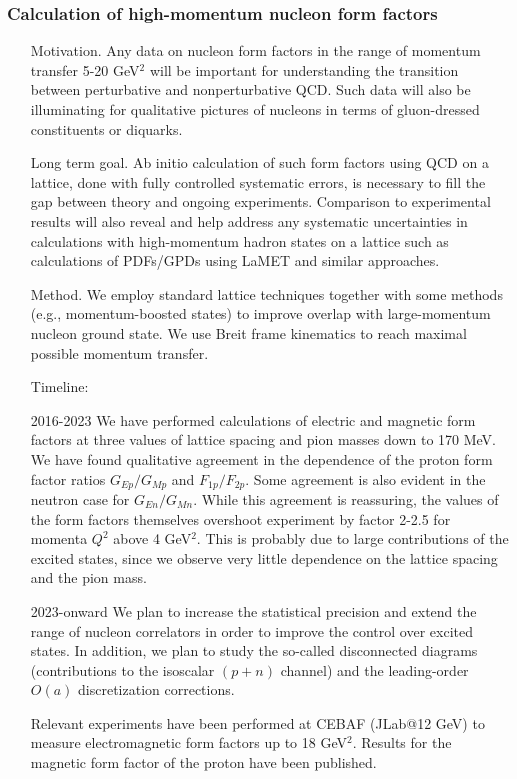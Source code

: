 \documentclass[prd,showpacs,showkeys,preprintnumbers,floatfix,
nofootinbib%
]{revtex4-2}
\begin{document}
\subsubsection{Calculation of high-momentum nucleon form factors}
\begin{itemize}
    \item[Motivation.] Any data on nucleon form factors in the range of momentum transfer 5-20 GeV$^2$ will be important for understanding the transition between perturbative and nonperturbative QCD. Such data will also be illuminating for qualitative pictures of nucleons in terms of gluon-dressed constituents or diquarks.
    \item[Long term goal.] Ab initio calculation of such form factors using QCD on a lattice, done with fully controlled systematic errors, is necessary to fill the gap between theory and ongoing experiments. Comparison to experimental results will also reveal and help address any systematic uncertainties in calculations with high-momentum hadron states on a lattice such as calculations of PDFs/GPDs using LaMET and similar approaches.
    \item[Method.] We employ standard lattice techniques together with some methods (e.g., momentum-boosted states) to improve overlap with large-momentum nucleon ground state. We use Breit frame kinematics to reach maximal possible momentum transfer.
\item[Timeline:]
    \item[2016-2023] We have performed calculations of electric and magnetic form factors at three values of lattice spacing and pion masses down to 170 MeV. We have found qualitative agreement in the dependence of the proton form factor ratios $G_{Ep}/G_{Mp}$ and $F_{1p}/F_{2p}$. Some agreement is also evident in the neutron case for $G_{En}/G_{Mn}$. While this agreement is reassuring, the values of the form factors themselves overshoot experiment by factor 2-2.5 for momenta $Q^2$ above 4 GeV$^2$. This is probably due to large contributions of the excited states, since we observe very little dependence on the lattice spacing and the pion mass.
    \item[2023-onward] We plan to increase the statistical precision and extend the range of nucleon correlators in order to improve the control over excited states. In addition, we plan to study the so-called disconnected diagrams (contributions to the isoscalar $(p+n)$ channel) and the leading-order $O(a)$ discretization corrections.
    \item[Relevant experiments] have been performed at CEBAF (JLab@12 GeV) to measure electromagnetic form factors up to 18 GeV$^2$. Results for the magnetic form factor of the proton have been published.
\end{itemize}
\end{document}
